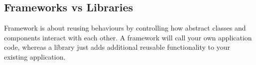 \subsection{Frameworks vs Libraries}\label{sub:frameworks_vs_libraries}

Framework is about reusing behaviours by controlling how abstract classes and components interact with each other.
A framework will call your own application code, whereas a library just adds additional reusable functionality to your existing application.

